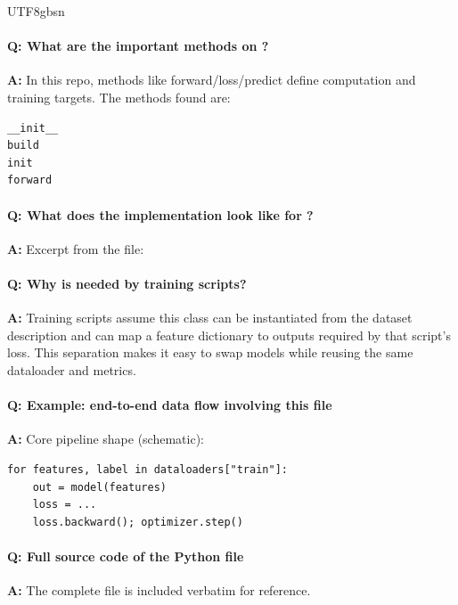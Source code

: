 \documentclass[11pt]{article}
\begin{document}
\begin{CJK*}{UTF8}{gbsn}
\paragraph{Q: What are the important methods on \texttt{}?}
\textbf{A:} In this repo, methods like forward/loss/predict define computation and training targets. The methods found are:

\begin{Verbatim}[fontsize=\small]
__init__
build
init
forward
\end{Verbatim}

\paragraph{Q: What does the implementation look like for \texttt{}?}
\textbf{A:} Excerpt from the file:

\vspace{1mm}


\paragraph{Q: Why is \texttt{} needed by training scripts?}
\textbf{A:} Training scripts assume this class can be instantiated from the dataset description and can map a feature dictionary to outputs required by that script's loss. This separation makes it easy to swap models while reusing the same dataloader and metrics.

\paragraph{Q: Example: end-to-end data flow involving this file}
\textbf{A:} Core pipeline shape (schematic):

\begin{Verbatim}[fontsize=\small]
for features, label in dataloaders["train"]:
    out = model(features)
    loss = ...
    loss.backward(); optimizer.step()
\end{Verbatim}

\paragraph{Q: Full source code of the Python file}
\textbf{A:} The complete file is included verbatim for reference.


\end{CJK*}
\end{document}

